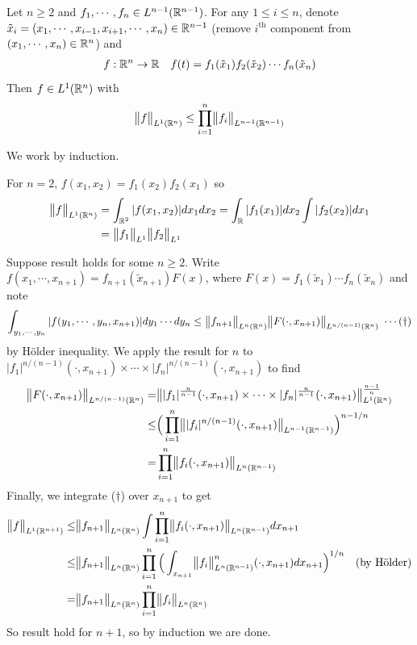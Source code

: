 \documentclass[12pt,a4paper]{report}
\newenvironment{proof}
{\begin{changemargin}{1cm}{0.5cm} 
	}%
	{\end{changemargin}
}
\begin{document}
\lem Let $n\geq 2$ and $f_1, \cdots, f_n \in L^{n-1}(\mathbb{R}^{n-1})$. For any $1\leq i\leq n$, denote $\tilde{x}_i = (x_1, \cdots, x_{i-1}, x_{i+1}, \cdots, x_n) \in \mathbb{R}^{n-1}$ (remove $i^{\text{th}}$ component from $(x_1, \cdots, x_n) \in \mathbb{R}^n$) and
\begin{align*}
f : \mathbb{R}^n \rightarrow \mathbb{R} \quad f(t) = f_1(\tilde{x}_1) f_2(\tilde{x}_2) \cdots f_n(\tilde{x}_n)
\end{align*}
Then $f\in L^1(\mathbb{R}^n)$ with
\begin{align*}
\bigl\lVert f\bigr\rVert_{L^1(\mathbb{R}^n)} \leq \prod_{i=1}^n \bigl\lVert f_i\bigr\rVert_{L^{n-1}(\mathbb{R}^{n-1})}
\end{align*}
\begin{proof}
\pf We work by induction.

\quad For $n=2$, $f(x_1,x_2) = f_1(x_2)f_2(x_1)$ so
\begin{align*}
\bigl\lVert f\bigr\rVert_{L^1(\mathbb{R}^n)} &= \int_{\mathbb{R}^2} |f(x_1,x_2)| dx_1 dx_2 = \int_{\mathbb{R}} |f_1(x_1)| dx_2 \int |f_2(x_2)| dx_1 \\
&= \bigl\lVert f_1\bigr\rVert_{L^1} \bigl\lVert f_2\bigr\rVert_{L^1}
\end{align*}

\quad Suppose result holds for some $n \geq 2$. Write $f(x_1, \cdots, x_{n+1}) = f_{n+1}(\tilde{x}_{n+1}) F(x)$, where $F(x)  = f_1(\tilde{x}_1) \cdots f_n(\tilde{x}_n)$ and note
\begin{align*}
\int_{y_1, \cdots, y_n} |f(y_1,\cdots, y_n, x_{n+1})| dy_1 \cdots dy_n \leq \bigl\lVert f_{n+1}\bigr\rVert_{L^n(\mathbb{R}^n)} \bigl\lVert F(\cdot, x_{n+1})\bigr\rVert_{L^{n/(n-1)}(\mathbb{R}^n)} \,\, \cdots (\dagger)
\end{align*}
by H\"{o}lder inequality. We apply the result for $n$ to $|f_1|^{n/(n-1)}(\cdot, x_{n+1}) \times \cdots \times |f_n|^{n/(n-1)}(\cdot, x_{n+1})$ to find
\begin{align*}
\bigl\lVert F(\cdot, x_{n+1})\bigr\rVert_{L^{n/(n-1)}(\mathbb{R}^{n})} =& \bigl\lVert |f_1|^{\frac{n}{n-1}}(\cdot, x_{n+1}) \times \cdots \times |f_n|^{\frac{n}{n-1}}(\cdot, x_{n+1})\bigr\rVert_{L^1(\mathbb{R}^n)}^{\frac{n-1}{n}} \\
\leq & \Big( \prod_{i=1}^n \bigl\lVert |f_i|^{n/(n-1)} (\cdot, x_{n+1}) \bigr\rVert_{L^{n-1}(\mathbb{R}^{n-1})} \Big)^{n-1/n} \\
= & \prod_{i=1}^n \bigl\lVert f_i (\cdot, x_{n+1})\bigr\rVert_{L^n(\mathbb{R}^{n-1})}
\end{align*}
Finally, we integrate ($\dagger$) over $x_{n+1}$ to get
\begin{align*}
\bigl\lVert f\bigr\rVert_{L^1(\mathbb{R}^{n+1})} \leq & \bigl\lVert f_{n+1}\bigr\rVert_{L^n(\mathbb{R}^n)} \int \prod_{i=1}^n \bigl\lVert f_i(\cdot, x_{n+1})\bigr\rVert_{L^n(\mathbb{R}^{n-1})} dx_{n+1} \\
\leq & \bigl\lVert f_{n+1}\bigr\rVert_{L^n(\mathbb{R}^n)} \prod_{i=1}^n \Big(  \int_{x_{n+1}} \bigl\lVert f_i\bigr\rVert_{L^n(\mathbb{R}^{n-1})}^n (\cdot, x_{n+1}) dx_{n+1}  \Big)^{1/n} \quad \text{(by H\"{o}lder)} \\ 
= & \bigl\lVert f_{n+1}\bigr\rVert_{L^n(\mathbb{R}^n)} \prod_{i=1}^n \bigl\lVert f_i\bigr\rVert_{L^n(\mathbb{R}^n)}
\end{align*}
So result hold for $n+1$, so by induction we are done.

\eop
\end{proof}
\s
\end{document}
